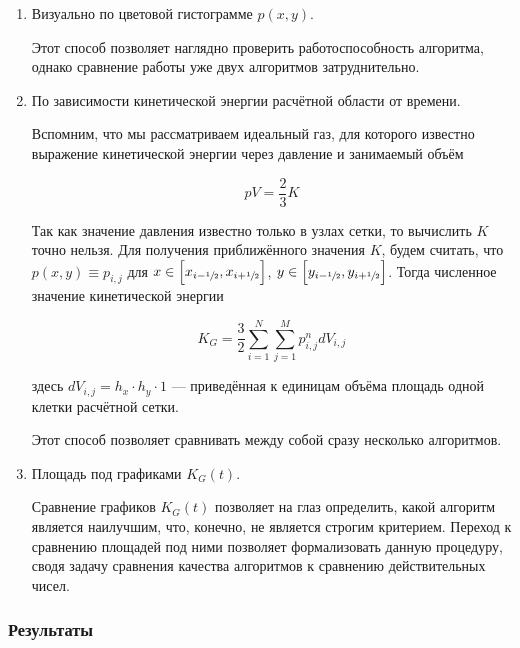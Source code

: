 \begin{enumerate}
    \item Визуально по цветовой гистограмме $p(x,y)$. 
    
    Этот способ позволяет наглядно проверить работоспособность алгоритма, однако сравнение работы уже двух алгоритмов   затруднительно.
    
    \item По зависимости кинетической энергии расчётной области от времени.
    
    Вспомним, что мы рассматриваем идеальный газ, для которого известно выражение кинетической энергии через давление и занимаемый объём
    
    \begin{equation*}
        pV = \dfrac{2}{3} K
    \end{equation*}
    
     Так как значение давления известно только в узлах сетки, то вычислить $K$ точно нельзя. Для получения приближённого значения $K$, будем считать, что $p(x,y) \equiv p_{i,j}$ для $x \in \left[x_{i-\sfrac{1}{2}}, x_{i+\sfrac{1}{2}}\right]$, $y \in \left[y_{i-\sfrac{1}{2}}, y_{i+\sfrac{1}{2}}\right]$. Тогда численное значение кинетической энергии
     
    \begin{equation}
        K_G = \dfrac{3}{2} \sum_{i=1}^N \sum_{j=1}^M p_{i,j}^n dV_{i,j}
    \end{equation}
    
    здесь $dV_{i,j} = h_x \cdot h_y \cdot 1$ --- приведённая к единицам объёма площадь одной клетки расчётной сетки.
    
    Этот способ позволяет сравнивать между собой сразу несколько алгоритмов.
    
    \item Площадь под графиками $K_G(t)$.
    
    Сравнение графиков $K_G(t)$ позволяет на глаз определить, какой алгоритм является наилучшим, что, конечно, не является строгим критерием. Переход к сравнению площадей под ними позволяет формализовать данную процедуру, сводя задачу сравнения качества алгоритмов к сравнению действительных чисел.
\end{enumerate}

\subsubsection{Результаты}


